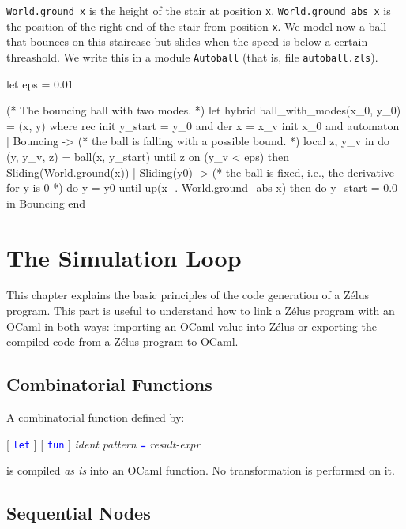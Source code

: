 \documentclass[11pt,titlepage,twoside]{report}
\makeatletter
\newcommand{\zls}[1]{{\@span{class="zelusinline"}#1}}
\newcommand{\zls}[1]{\texttt{#1}}
\renewcommand{\zls}[1]{\texttt{#1}}
\newcommand{\zelus}{{\sf Z\'elus}}
\newcommand{\ocaml}{{\sf OCaml}}
\newcommand{\term}[1]{\textcolor{Blue}{\tt #1}}
\newcommand{\nterm}[1]{\textcolor{BrickRed}{\it #1}}
\newcommand{\term}[1]{{\tt #1}}
\newcommand{\nterm}[1]{{\em #1}}
\makeatother
\begin{document}
\zls{World.ground x} is the height of the stair at position
\zls{x}. \zls{World.ground\_abs x} is the position of the right end of the
stair from position \zls{x}. We model now a ball that bounces on this
staircase but slides when the speed is below a certain threashold. We
write this in a module \zls{Autoball} (that is, file
\verb-autoball.zls-).
\begin{chklisting}
let eps = 0.01

(* The bouncing ball with two modes. *)
let hybrid ball_with_modes(x_0, y_0) = (x, y) where
  rec init y_start = y_0 
  and der x = x_v init x_0
  and automaton
      | Bouncing ->
         (* the ball is falling with a possible bound. *)
         local z, y_v in
         do (y, y_v, z) = ball(x, y_start)
         until z on (y_v < eps) then Sliding(World.ground(x))
      | Sliding(y0) ->
         (* the ball is fixed, i.e., the derivative for y is 0 *)
         do 
           y = y0 
         until up(x -. World.ground_abs x)
         then do y_start = 0.0 in Bouncing
      end
\end{chklisting}

\chapter{The Simulation Loop\label{simulation-loop}} %

This chapter explains the basic principles of the code generation of a \zelus{}
program. This part is useful to understand how to link a \zelus{} program
with an \ocaml{} in both ways: importing an \ocaml{} value into \zelus{}
or exporting the compiled code from a \zelus{} program to \ocaml.

\section{Combinatorial Functions\label{combfuncs}} %

A combinatorial function defined by:
\begin{center}
  [ \term{let} ] [ \term{fun} ] \nterm{ident} \nterm{pattern} \term{=}
  \nterm{result-expr}
\end{center}

is compiled \emph{as is} into an \ocaml{} function. No transformation is
performed on it.

\section{Sequential Nodes\label{seqnodes}} %
\end{document}
